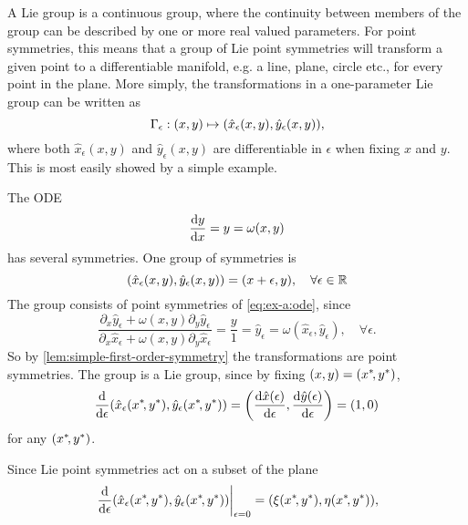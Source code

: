 A Lie group is a continuous group, where the continuity between members of the group can be described by one or more real valued parameters.
For point symmetries, this means that a group of Lie point symmetries will transform a given point to a differentiable manifold, e.g. a line, plane, circle etc., for every point in the plane.
More simply, the transformations in a one-parameter Lie group can be written as
\begin{equation}
  \Gamma_\epsilon: \pqty{x,y} \mapsto \pqty{\hat{x}_\epsilon(x,y), \hat{y}_\epsilon(x,y)},
\end{equation}
where both \(\hat{x}_\epsilon(x,y)\) and \(\hat{y}_\epsilon(x,y)\) are differentiable in \(\epsilon\) when fixing \(x\) and \(y\).
This is most easily showed by a simple example.
\begin{exmp}
  The ODE
  \begin{equation} \label{eq:ex-a:ode}
    \dv{y}{x} = y = \omega(x, y)
  \end{equation}
  has several symmetries.
  One group of symmetries is
  \begin{equation} \label{eq:ex-a:transformation}
    \pqty{\hat{x}_\epsilon(x,y), \hat{y}_\epsilon(x,y)} = \pqty{x + \epsilon, y}, \quad
    \forall \epsilon \in \reals
  \end{equation}
  The group consists of point symmetries of \cref{eq:ex-a:ode}, since
  \begin{equation}
    \frac{\partial_x \hat{y}_\epsilon + \omega(x,y) \partial_y \hat{y}_\epsilon}{\partial_x \hat{x}_\epsilon + \omega(x,y) \partial_y \hat{x}_\epsilon} =
    \frac{y}{1} =
    \hat{y}_\epsilon =
    \omega(\hat{x}_\epsilon,\hat{y}_\epsilon), \quad
    \forall \epsilon.
  \end{equation}
  So by \cref{lem:simple-first-order-symmetry} the transformations are point symmetries.
  The group is a Lie group, since by fixing \(\pqty{x,y}=\pqty{x^*\!,y^*}\),
  \begin{equation}
    \dv{\epsilon} \pqty{\hat{x}_\epsilon(x^*\!,y^*), \hat{y}_\epsilon(x^*\!,y^*)} =
    \pqty{\dv{\hat{x}(\epsilon)}{\epsilon}, \dv{\hat{y}(\epsilon)}{\epsilon}} =
    \pqty{1,0}
  \end{equation}
  for any \(\pqty{x^*\!,y^*}\).
\end{exmp}
Since Lie point symmetries act on a subset of the plane
\begin{equation}
  \eval{\dv{\epsilon} \pqty{\hat{x}_\epsilon(x^*\!,y^*), \hat{y}_\epsilon(x^*\!,y^*)}}_{\epsilon=0} = \pqty{\xi(x^*\!,y^*), \eta(x^*\!,y^*)},
\end{equation}
